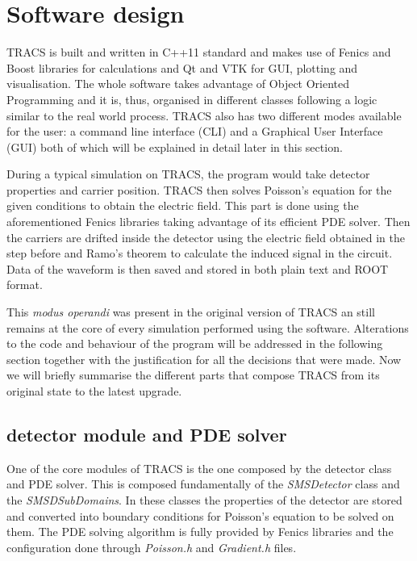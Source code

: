 \section{Software design} %
\label{sec:results_and_achievements}

TRACS is built and written in C++11 standard and makes use of Fenics and Boost libraries for calculations and Qt and VTK for GUI, plotting and visualisation. The whole software takes advantage of Object Oriented Programming and it is, thus, organised in different classes following a logic similar to the real world process. TRACS also has two different modes available for the user: a command line interface (CLI) and a Graphical User Interface (GUI) both of which will be explained in detail later in this section.

During a typical simulation on TRACS, the program would take detector properties and carrier position. TRACS then solves Poisson's equation for the given conditions to obtain the electric field. This part is done using the aforementioned Fenics libraries taking advantage of its efficient PDE solver. Then the carriers are drifted inside the detector using the electric field obtained in the step before and Ramo's theorem to calculate the induced signal in the circuit. Data of the waveform is then saved and stored in both plain text and ROOT format.

This \textit{modus operandi} was present in the original version of TRACS an still remains at the core of every simulation performed using the software. Alterations to the code and behaviour of the program will be addressed in the following section together with the justification for all the decisions that were made. Now we will briefly summarise the different parts that compose TRACS from its original state to the latest upgrade.

\subsection{detector module and PDE solver}

One of the core modules of TRACS is the one composed by the detector class and PDE solver. This is composed fundamentally of the \textit{SMSDetector} class and the \textit{SMSDSubDomains}. In these classes the properties of the detector are stored and converted into boundary conditions for Poisson's equation to be solved on them. The PDE solving algorithm is fully provided by Fenics libraries and the configuration done through \textit{Poisson.h} and \textit{Gradient.h} files.

